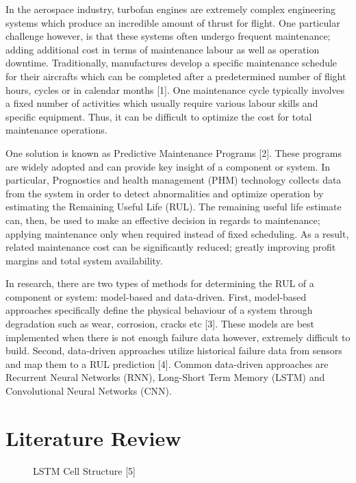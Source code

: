 \documentclass[journal]{IEEEtran}
\begin{document}
In the aerospace industry, turbofan engines are extremely complex engineering systems which produce an incredible amount of thrust for flight. One particular challenge however, is that these systems often undergo frequent maintenance; adding additional cost in terms of maintenance labour as well as operation downtime. Traditionally, manufactures develop a specific maintenance schedule for their aircrafts which can be completed after a predetermined number of flight hours, cycles or in calendar months [1]. One maintenance cycle typically involves a fixed number of activities which usually require various labour skills and specific equipment. Thus, it can be difficult to optimize the cost for total maintenance operations. 

One solution is known as Predictive Maintenance Programs [2]. These programs are widely adopted and can provide key insight of a component or system. In particular, Prognostics and health management (PHM) technology collects data from the system in order to detect abnormalities and optimize operation by estimating the Remaining Useful Life (RUL). The remaining useful life estimate can, then, be used to make an effective decision in regards to maintenance; applying maintenance only when required instead of fixed scheduling. As a result, related maintenance cost can be significantly reduced; greatly improving profit margins and total system availability. 

In research, there are two types of methods for determining the RUL of a component or system: model-based and data-driven. First, model-based approaches specifically define the physical behaviour of a system through degradation such as wear, corrosion, cracks etc [3]. These models are best implemented when there is not enough failure data however, extremely difficult to build. Second, data-driven approaches utilize historical failure data from sensors and map them to a RUL prediction [4]. Common data-driven approaches are Recurrent Neural Networks (RNN), Long-Short Term Memory (LSTM) and Convolutional Neural Networks (CNN). 



\section{Literature Review}
\label{Literature Review} 

\begin{figure}[htbp]
	\centering
	\captionsetup{justification = centering}
	\caption{LSTM Cell Structure [5]}
	\label{fig:LSTM}
\end{figure}
\end{document}
